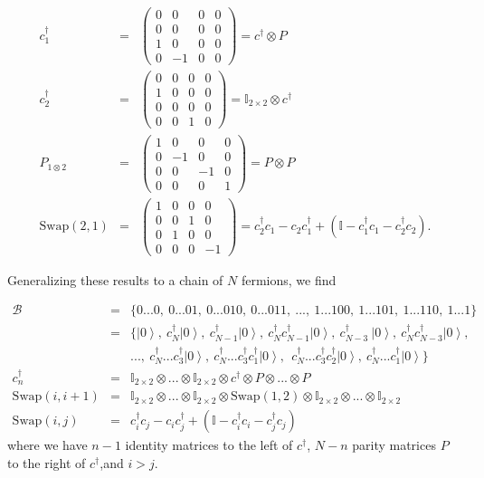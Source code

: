 \documentclass{article}
\newcommand{\ket}[1]{\left| #1 \right>} %
\theoremstyle{definition}
\begin{document}
\begin{eqnarray}
c^\dag_1 &=&
\begin{pmatrix}
0 & 0 & 0 & 0\\
0 & 0 & 0 & 0\\
1 & 0 & 0 & 0\\
0 & -1 & 0 & 0
\end{pmatrix}
= c^\dag \otimes P\\
c^\dag_2 &=&
\begin{pmatrix}
0 & 0 & 0 & 0\\
1 & 0 & 0 & 0\\
0 & 0 & 0 & 0\\
0 & 0 & 1 & 0
\end{pmatrix}
= \mathbb{I}_{2\times2} \otimes c^\dag\\
P_{1 \otimes 2} &=&
\begin{pmatrix}
1 & 0 & 0 & 0\\
0 & -1 & 0 & 0\\
0 & 0 & -1 & 0\\
0 & 0 & 0 & 1
\end{pmatrix}
= P \otimes P\\
\text{Swap}(2,1) &=&
\begin{pmatrix}
1 & 0 & 0 & 0\\
0 & 0 & 1 & 0\\
0 & 1 & 0 & 0\\
0 & 0 & 0 & -1
\end{pmatrix}
= c^\dag_2 c_1 - c_2 c^\dag_1 + \left(\mathbb{I} - c^\dag_1 c_1 - c^\dag_2 c_2\right).
\end{eqnarray}

Generalizing these results to a chain of $N$ fermions, we find

\begin{eqnarray}
\mathcal{B} &=& \{0...0, \ 0...01, \ 0...010, \ 0...011, \ ..., \ 1...100, \ 1...101, \ 1...110, \ 1...1 \} \\
&=& \{\ket{0}, \ c^\dag_N \ket{0}, \ c^\dag_{N-1} \ket{0}, \ c^\dag_{N} c^\dag_{N-1} \ket{0}, \ c^\dag_{N-3}\ \ket{0}, \ c^\dag_N c^\dag_{N-3} \ket{0} ,\\
&& ...,\ c^\dag_N...c^\dag_3 \ket{0}, \ c^\dag_N...c^\dag_3 c^\dag_1 \ket{0},\ \ c^\dag_N...c^\dag_3 c^\dag_2 \ket{0}, \ c^\dag_N...c^\dag_1 \ket{0}\} \nonumber \\
c^\dag_n &=& \mathbb{I}_{2\times2}\otimes ... \otimes \mathbb{I}_{2\times2} \otimes c^\dag \otimes P \otimes... \otimes P\\
\text{Swap}(i,i+1) &=& \mathbb{I}_{2\times2} \otimes ... \otimes \mathbb{I}_{2\times2} \otimes \text{Swap}(1,2) \otimes \mathbb{I}_{2\times2} \otimes ... \otimes \mathbb{I}_{2\times2}\\
\text{Swap}(i,j) &=& c^\dag_i c_j - c_i c^\dag_j + \left(\mathbb{I} - c^\dag_i c_i - c^\dag_j c_j \right)
\end{eqnarray}
where we have $n-1$ identity matrices to the left of $c^\dag$, $N-n$ parity matrices $P$ to the right of $c^\dag$,and $i>j$. 
\end{document}
